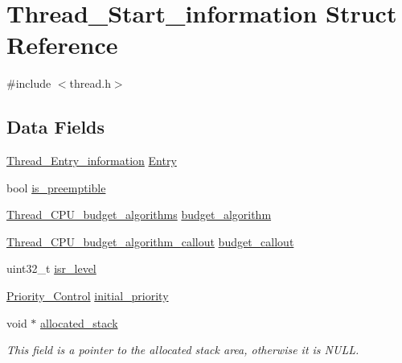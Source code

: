 \hypertarget{structThread__Start__information}{}\section{Thread\+\_\+\+Start\+\_\+information Struct Reference}
\label{structThread__Start__information}


{\ttfamily \#include $<$thread.\+h$>$}

\subsection*{Data Fields}
\begin{DoxyCompactItemize}
\item 
\mbox{\hyperlink{structThread__Entry__information}{Thread\+\_\+\+Entry\+\_\+information}} \mbox{\hyperlink{structThread__Start__information_a6696faf631c9319949e78de1a0783d32}{Entry}}
\item 
bool \mbox{\hyperlink{structThread__Start__information_a4bb8829e04040e7ee0cd64f09e272b46}{is\+\_\+preemptible}}
\item 
\mbox{\hyperlink{group__RTEMSScoreThread_gab6f48556812ffc781a69df144ef49be0}{Thread\+\_\+\+C\+P\+U\+\_\+budget\+\_\+algorithms}} \mbox{\hyperlink{structThread__Start__information_aab4f4dccde0c7691ac31e95fcee691ca}{budget\+\_\+algorithm}}
\item 
\mbox{\hyperlink{group__RTEMSScoreThread_ga2f15cbe9653e5bfcb2595454e9ffd14a}{Thread\+\_\+\+C\+P\+U\+\_\+budget\+\_\+algorithm\+\_\+callout}} \mbox{\hyperlink{structThread__Start__information_a2153af1919ee0ef1d7dc7db46e084d14}{budget\+\_\+callout}}
\item 
uint32\+\_\+t \mbox{\hyperlink{structThread__Start__information_a979a1eefc316d3daa85a7ee030eacf08}{isr\+\_\+level}}
\item 
\mbox{\hyperlink{group__RTEMSScorePriority_ga59d02b58072d31a9a1cfe644557aefe2}{Priority\+\_\+\+Control}} \mbox{\hyperlink{structThread__Start__information_ac0c613daf5bae501475764b70b12d2af}{initial\+\_\+priority}}
\item 
\mbox{\label{structThread__Start__information_aa639dafb1dc2bc510378f1810ee2786e}} 
void $\ast$ \mbox{\hyperlink{structThread__Start__information_aa639dafb1dc2bc510378f1810ee2786e}{allocated\+\_\+stack}}
\begin{DoxyCompactList}\small\item\em This field is a pointer to the allocated stack area, otherwise it is N\+U\+LL. \end{DoxyCompactList}\item 

\end{DoxyCompactItemize}
